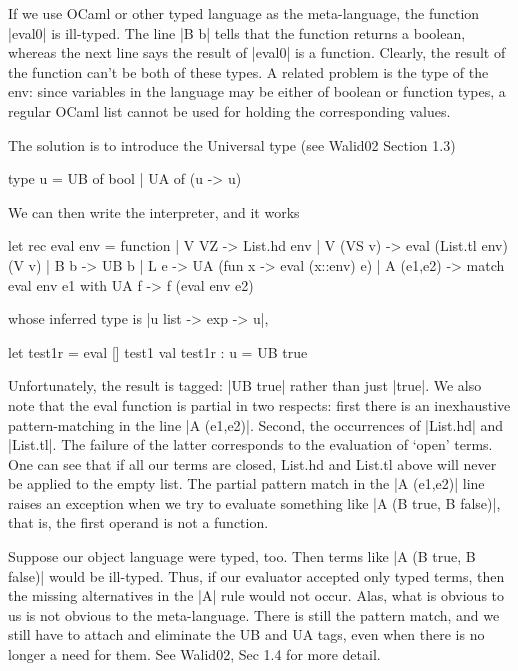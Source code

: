 If we use OCaml or other typed language as the meta-language, 
the function |eval0| is ill-typed. The line |B b|
tells that the function returns a boolean, whereas the next line says
the result of |eval0| is a function. Clearly, the result of the
function can't be both of these types. 
A related problem is the type of the env: since variables
in the language may be either of boolean or function types, a regular
OCaml list cannot be used for holding the corresponding values. 

The solution is to introduce the Universal type (see Walid02 Section
1.3)

\begin{code}
  type u = UB of bool | UA of (u -> u)
\end{code}

We can then write the interpreter, and it works
\begin{code}
  let rec eval env = function
  | V VZ -> List.hd env
  | V (VS v) -> eval (List.tl env) (V v)
  | B b -> UB b
  | L e -> UA (fun x -> eval (x::env) e)
  | A (e1,e2) -> match eval env e1 with UA f -> f (eval env e2)
\end{code}
whose inferred type is |u list -> exp -> u|,

\begin{code}
  let test1r = eval [] test1
  val test1r : u = UB true 
\end{code}

Unfortunately, the result is tagged: |UB true| rather than just
|true|. We also note that the eval function is partial in two
respects: first there is an inexhaustive pattern-matching in the 
line |A (e1,e2)|.
Second, the occurrences of |List.hd| and |List.tl|.
The failure of the latter corresponds to the evaluation of `open'
terms. One can see that if all our terms are closed, List.hd and
List.tl above will never be applied to the empty list. The partial
pattern match in the |A (e1,e2)| line raises an exception when we try to
evaluate something like |A (B true, B false)|, that is, the first
operand is not a function. 

Suppose our object language were typed, too. Then terms like
|A (B true, B false)| would be ill-typed. Thus, if our evaluator
accepted only typed terms, then the missing alternatives in the |A|
rule would not occur. Alas, what is obvious to us is not obvious to
the meta-language. There is still the pattern match, and we still have
to attach and eliminate the UB and UA tags, even when there is no
longer a need for them. See Walid02, Sec 1.4 for more detail.

